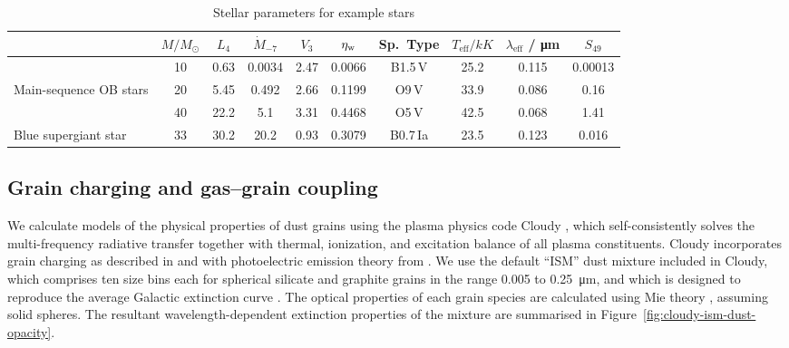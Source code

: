 \begin{table}
  \centering
  \caption{Stellar parameters for example stars}
  \label{tab:stars}
  \begin{tabular}{l S S S S S S S S S}
    \toprule
    & {\(M / \si{M_\odot}\)} & {\(L_4\)}
    & {\(\dot{M}_{-7}\)} & {\(V_3\)} & {\( \eta_{\text{w}} \)}
    & {Sp.~Type} 
    & {\(T_{\text{eff}} / \si{kK}\)} & {\(\lambda_{\text{eff}}\) / \si{\um}}
    & {\(S_{49}\)} 
    \\
    \midrule
    & 10 & 0.63 & 0.0034 & 2.47 & 0.0066 & {B1.5\,V} & 25.2 & 0.115 & 0.00013
                   \\
    Main-sequence OB stars
    & 20 & 5.45 & 0.492 & 2.66 & 0.1199 & {O9\,V} & 33.9 & 0.086 & 0.16
                    \\
    & 40 & 22.2 & 5.1 & 3.31 & 0.4468 & {O5\,V} & 42.5 & 0.068 & 1.41
                   \\[\smallskipamount]
    Blue supergiant star
    & 33 & 30.2 & 20.2 & 0.93 & 0.3079 & {B0.7\,Ia} & 23.5 & 0.123 & 0.016
                   \\
    \bottomrule
  \end{tabular}
\end{table}

\subsection{Grain charging and gas--grain coupling}
\label{sec:cloudy-models-dust}

We calculate models of the physical properties of dust grains using
the plasma physics code Cloudy \citep{Ferland:2013a, Ferland:2017a},
which self-consistently solves the multi-frequency radiative transfer
together with thermal, ionization, and excitation balance of all
plasma constituents.  Cloudy incorporates grain charging as described
in \citet{Baldwin:1991a} and \citet{van-Hoof:2004a} with photoelectric
emission theory from \citet{Weingartner:2001b, Weingartner:2006a}.  We
use the default ``ISM'' dust mixture included in Cloudy, which
comprises ten size bins each for spherical silicate and graphite
grains in the range \num{0.005} to \SI{0.25}{\um}, and which is
designed to reproduce the average Galactic extinction curve
\citep{Weingartner:2001a, Abel:2008a}.  The optical properties of each
grain species are calculated using Mie theory \citep{Bohren:1983a},
assuming solid spheres.  The resultant wavelength-dependent extinction
properties of the mixture are summarised in
Figure~\ref{fig:cloudy-ism-dust-opacity}.


